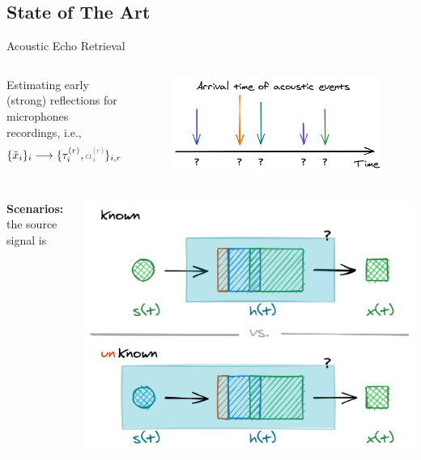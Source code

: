 \subsection*{State of The Art}

\begin{frame}[t]{Acoustic Echo Retrieval \hfill\faPalette}
    \begin{columns}[T,onlytextwidth]
            Estimating early (strong) reflections for microphones recordings, i.e.,
            \begin{equation*}
                \{\contMic_i\}_i \longrightarrow \{ \tauir, \textcolor{gray}{\ampir} \}_{i,r}
            \end{equation*}
            \begin{figure}
                \centering
                \includegraphics[width=\textwidth]{./figures/arrivals.png}
            \end{figure}
    \end{columns}

    \vfill
    \begin{columns}[T,onlytextwidth]
        \textbf{Scenarios:} the source signal is

        \begin{center}
            \includegraphics[width=.9\textwidth]{./figures/active-passive.png}
        \end{center}


\end{columns}
\end{frame}

